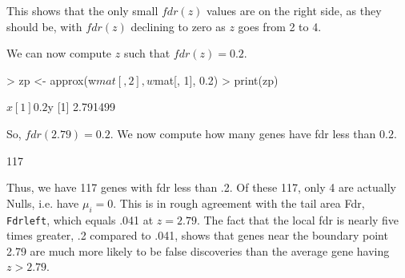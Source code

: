 \documentclass[11pt]{article}
\begin{document}
This shows that the only small $fdr(z)$ values are on the right side, as
they should be, with $fdr(z)$ declining to zero as $z$ goes from 2 to
4. 

We can now compute $z$ such that $fdr(z)=0.2$.

\begin{Schunk}
\begin{Sinput}
> zp <- approx(w$mat[, 2], w$mat[, 1], 0.2)
> print(zp)
\end{Sinput}
\begin{Soutput}
$x
[1] 0.2

$y
[1] 2.791499
\end{Soutput}
\end{Schunk}

So, $fdr(2.79) = 0.2$. We now compute how many genes have fdr
less than $0.2$.

\begin{Schunk}
\begin{Soutput}
[1] 117
\end{Soutput}
\end{Schunk}

Thus, we have 117 genes with fdr less than .2. Of these 117, only 4
are actually Nulls, i.e. have $\mu_i=0$. This is in rough agreement
with the tail area Fdr, \texttt{Fdrleft}, which equals .041 at
$z=2.79$. The fact that the local fdr is nearly five times greater, .2
compared to .041, shows that genes near the boundary point 2.79 are
much more likely to be false discoveries than the average gene having
$z > 2.79$.
\end{document}
